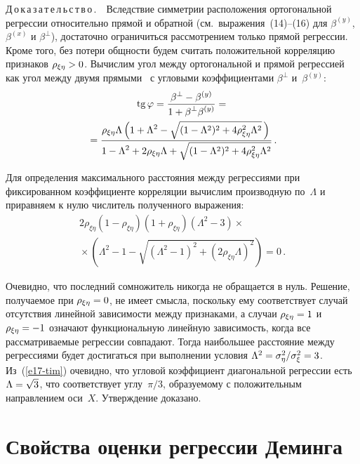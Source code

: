 \begin{multicols}{2}
\noindent
  Д\,о\,к\,а\,з\,а\,т\,е\,л\,ь\,с\,т\,в\,о\,.\ \ Вследствие симметрии расположения
ортогональной регрессии относительно прямой и обратной (см.\ выражения~(14)--(16)
для $\beta^{(y)}$, $\beta^{(x)}$ и $\beta^\perp$), достаточно ограничиться
рас\-смот\-ре\-ни\-ем только прямой регрессии. Кроме того, без потери общности
будем считать положительной корреляцию признаков $\rho_{\xi\eta}\hm>0$.
Вычислим угол между ортогональной и прямой регрессией как угол между
двумя прямыми~\cite{12-tim} с угловыми коэффициентами $\beta^\perp$
и~$\beta^{(y)}$:
  \begin{multline*}
  \,\mathrm{tg}\,\varphi = \displaystyle\frac{\displaystyle \beta^\perp -\beta^{(y)}\mathstrut}{\displaystyle 1+\beta^\perp \beta^{(y)}\mathstrut} ={}\\
  {}=
  \displaystyle\frac{\displaystyle \rho_{\xi\eta}\Lambda \left(1+\Lambda^2-\sqrt{(1-\Lambda^2)^2 +4
\rho^2_{\xi\eta}\Lambda^2}\,\right)\mathstrut}{\displaystyle 1-\Lambda^2 +2\rho_{\xi\eta}\Lambda +
  \sqrt{(1-\Lambda^2)^2+4\rho^2_{\xi\eta}\Lambda^2}\mathstrut}\,.
  \end{multline*}

  Для определения максимального расстояния между регрессиями при
фиксированном коэффициенте корреляции вычислим производную
по~$\Lambda$ и приравняем к нулю числитель полученного выражения:
  \begin{multline*}
  2\rho_{\xi\eta}(1-\rho_{\xi\eta}) (1+\rho_{\xi\eta})(\Lambda^2-3)\times{}\\
  {}\times\left(
\Lambda^2 -1-\sqrt{\left(\Lambda^2-1\right)^2+\left(
2\rho_{\xi\eta}\Lambda\right)^2}\right) =0\,.
  \end{multline*}

  Очевидно, что последний сомножитель никогда не обращается в нуль.
Решение, получаемое при $\rho_{\xi\eta}\hm=0$, не имеет смысла, поскольку
ему соответствует случай отсутствия линейной зависимости между
признаками, а случаи $\rho_{\xi\eta}\hm=1$ и $\rho_{\xi\eta}\hm=-1$
означают функциональную линейную зависимость, когда все
рассматриваемые регрессии совпадают. Тогда наибольшее расстояние между
регрессиями будет достигаться при выполнении условия
$\Lambda^2\hm=\sigma_\eta^2/\sigma_\xi^2\hm=3$. Из~(\ref{e17-tim})
очевидно, что угловой коэффициент диагональной регрессии есть
$\Lambda\hm=\sqrt{3}$, что соответствует углу~$\pi/3$, образуемому с
положительным направлением оси~$X$. Утверждение доказано.

\section{Свойства оценки регрессии Деминга}


\end{multicols}
